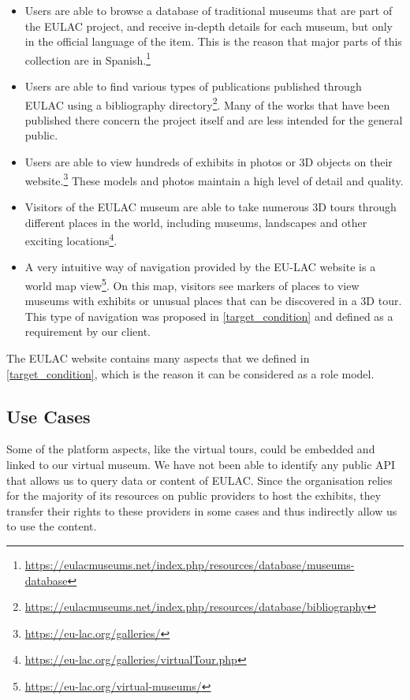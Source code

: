 \begin{itemize} 
\item Users are able to browse a database of traditional museums that are part of the EULAC project, and receive in-depth details for each museum, but only in the official language of the item. This is the reason that major parts of this collection are in Spanish.\footnote{\url{https://eulacmuseums.net/index.php/resources/database/museums-database}}
\item Users are able to find various types of publications published through EULAC using a bibliography directory\footnote{\url{https://eulacmuseums.net/index.php/resources/database/bibliography}}. Many of the works that have been published there concern the project itself and are less intended for the general public.
    \item Users are able to view hundreds of exhibits in photos or 3D objects on their website.\footnote{\url{https://eu-lac.org/galleries/}} These models and photos maintain a high level of detail and quality.
    \item Visitors of the EULAC museum are able to take numerous 3D tours through different places in the world, including museums, landscapes and other exciting locations\footnote{\url{https://eu-lac.org/galleries/virtualTour.php}}.
    \item A very intuitive way of navigation provided by the EU-LAC website is a world map view\footnote{\url{https://eu-lac.org/virtual-museums/}}. On this map, visitors see markers of places to view museums with exhibits or unusual places that can be discovered in a 3D tour. This type of navigation was proposed in \ref{target_condition} and defined as a requirement by our client.
\end{itemize}

\noindent The EULAC website contains many aspects that we defined in \ref{target_condition}, which is the reason it can be considered as a role model.

\subsection{Use Cases}

Some of the platform aspects, like the virtual tours, could be embedded and linked to our virtual museum. We have not been able to identify any public API that allows us to query data or content of EULAC. Since the organisation relies for the majority of its resources on public providers to host the exhibits, they transfer their rights to these providers in some cases and thus indirectly allow us to use the content.


